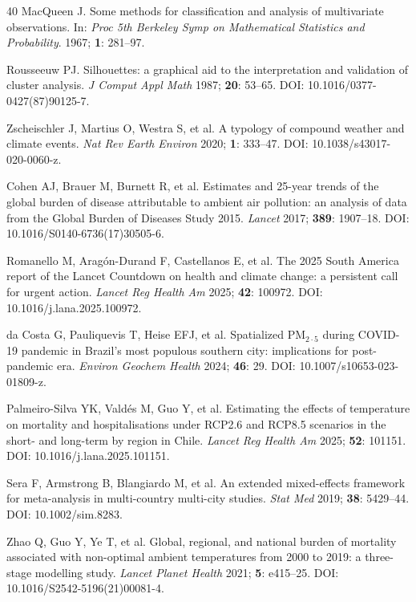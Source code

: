 \documentclass[review,number]{elsarticle}
\begin{document}
\begin{thebibliography}{40}
MacQueen J.
Some methods for classification and analysis of multivariate observations.
In: \textit{Proc 5th Berkeley Symp on Mathematical Statistics and Probability}. 1967; \textbf{1}: 281--97.

Rousseeuw PJ.
Silhouettes: a graphical aid to the interpretation and validation of cluster analysis.
\textit{J Comput Appl Math} 1987; \textbf{20}: 53--65.
DOI: 10.1016/0377-0427(87)90125-7.

Zscheischler J, Martius O, Westra S, et al.
A typology of compound weather and climate events.
\textit{Nat Rev Earth Environ} 2020; \textbf{1}: 333--47.
DOI: 10.1038/s43017-020-0060-z.

Cohen AJ, Brauer M, Burnett R, et al.
Estimates and 25-year trends of the global burden of disease attributable to ambient air pollution: an analysis of data from the Global Burden of Diseases Study 2015.
\textit{Lancet} 2017; \textbf{389}: 1907--18.
DOI: 10.1016/S0140-6736(17)30505-6.

Romanello M, Arag\'{o}n-Durand F, Castellanos E, et al.
The 2025 South America report of the Lancet Countdown on health and climate change: a persistent call for urgent action.
\textit{Lancet Reg Health Am} 2025; \textbf{42}: 100972.
DOI: 10.1016/j.lana.2025.100972.

da Costa G, Pauliquevis T, Heise EFJ, et al.
Spatialized $\text{PM}_{2{\cdot}5}$ during COVID-19 pandemic in Brazil's most populous southern city: implications for post-pandemic era.
\textit{Environ Geochem Health} 2024; \textbf{46}: 29.
DOI: 10.1007/s10653-023-01809-z.

Palmeiro-Silva YK, Valdés M, Guo Y, et al.
Estimating the effects of temperature on mortality and hospitalisations under RCP2.6 and RCP8.5 scenarios in the short- and long-term by region in Chile.
\textit{Lancet Reg Health Am} 2025; \textbf{52}: 101151.
DOI: 10.1016/j.lana.2025.101151.

Sera F, Armstrong B, Blangiardo M, et al.
An extended mixed-effects framework for meta-analysis in multi-country multi-city studies.
\textit{Stat Med} 2019; \textbf{38}: 5429--44.
DOI: 10.1002/sim.8283.

Zhao Q, Guo Y, Ye T, et al.
Global, regional, and national burden of mortality associated with non-optimal ambient temperatures from 2000 to 2019: a three-stage modelling study.
\textit{Lancet Planet Health} 2021; \textbf{5}: e415--25.
DOI: 10.1016/S2542-5196(21)00081-4.


\end{thebibliography}
\end{document}
